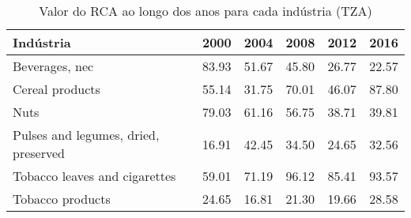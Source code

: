 \begin{table}
\centering
\caption{Valor do RCA ao longo dos anos para cada indústria (TZA)}
\begin{tabular}{p{6cm}p{1.5cm}p{1.5cm}p{1.5cm}p{1.5cm}p{1.5cm}}
\toprule
                           Indústria &  2000 &  2004 &  2008 &  2012 &  2016 \\
\midrule
                      Beverages, nec & 83.93 & 51.67 & 45.80 & 26.77 & 22.57 \\
                     Cereal products & 55.14 & 31.75 & 70.01 & 46.07 & 87.80 \\
                                Nuts & 79.03 & 61.16 & 56.75 & 38.71 & 39.81 \\
Pulses and legumes, dried, preserved & 16.91 & 42.45 & 34.50 & 24.65 & 32.56 \\
       Tobacco leaves and cigarettes & 59.01 & 71.19 & 96.12 & 85.41 & 93.57 \\
                    Tobacco products & 24.65 & 16.81 & 21.30 & 19.66 & 28.58 \\
\bottomrule
\end{tabular}
\end{table}

